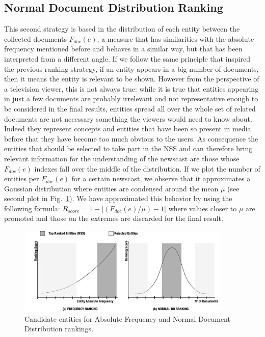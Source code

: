 \documentclass{llncs}
\begin{document}
\subsection{Normal Document Distribution Ranking}

This second strategy is based in the distribution of each entity between the collected documents $F_{doc}(e)$, a measure that has similarities with the absolute frequency mentioned before and behaves in a similar way, but that has been interpreted from a different angle. If we follow the same principle that inspired the previous ranking strategy, if an entity appears in a big number of documents, then it means the entity is relevant to be shown. However from the perspective of a television viewer, this is not always true: while it is true that entities appearing in just a few documents are probably irrelevant and not representative enough to be considered in the final results, entities spread all over the whole set of related documents are not necessary something the viewers would need to know about. Indeed they represent concepts and entities that have been so present in media before that they have become too much obvious to the users.  As consequence the entities that should be selected to take part in the NSS and can therefore bring relevant information for the understanding of the newscast are those whose $F_{doc}(e)$ indexes fall over the middle of the distribution. If we plot the number of entities per $F_{doc}(e)$ for a certain newscast, we observe that it approximates a Gaussian distribution where entities are condensed around the mean $\mu$ (see second plot in Fig.~\ref{fig:rankingStrategies}). We have approximated this behavior by using the following formula: $R_{score} = 1-\left | (F_{doc}(e)/\mu) -1 \right |$ where values closer to $\mu$ are promoted and those on the extremes are discarded for the final result.

\begin{figure}[h!]
\centering
\includegraphics[width=0.9\textwidth]{figure/RankingStrategies}
\caption{Candidate entities for Absolute Frequency and Normal Document Distribution rankings.}
\label{fig:rankingStrategies}%
\end{figure}
\end{document}
